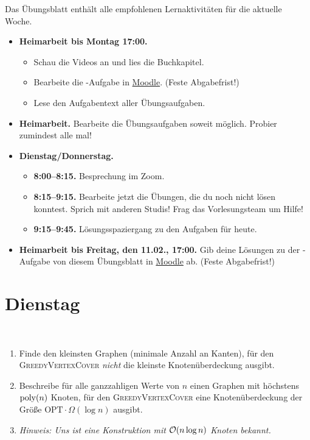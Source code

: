 \documentclass{uebung_cs}
\begin{document}
Das Übungsblatt enthält alle empfohlenen Lernaktivitäten für die aktuelle Woche.

\begin{itemize}
\item \textbf{Heimarbeit bis Montag 17:00.}
    \begin{itemize}
    \item 
    Schau die Videos an und lies die Buchkapitel.
    \item Bearbeite die -Aufgabe in \href{https://moodle.studiumdigitale.uni-frankfurt.de/moodle/course/view.php?id=2241}{Moodle}. (Feste Abgabefrist!)
    \item Lese den Aufgabentext aller Übungsaufgaben.
    \end{itemize}
\item \textbf{Heimarbeit.} Bearbeite die Übungsaufgaben soweit möglich. Probier zumindest alle mal!
\item \textbf{Dienstag/Donnerstag.}
\begin{itemize}
    \item \textbf{8:00--8:15.} Besprechung im Zoom.
    \item \textbf{8:15--9:15.} Bearbeite jetzt die Übungen, die du noch nicht lösen konntest. Sprich mit anderen Studis! Frag das Vorlesungsteam um Hilfe!
    \item \textbf{9:15--9:45.} Lösungsspaziergang zu den Aufgaben für heute.
\end{itemize}

\item \textbf{Heimarbeit bis Freitag, den 11.02., 17:00.} Gib deine Lösungen zu der -Aufgabe von diesem Übungsblatt in \href{https://moodle.studiumdigitale.uni-frankfurt.de/moodle/course/view.php?id=2241}{Moodle} ab. (Feste Abgabefrist!)
\end{itemize}

\section*{Dienstag}

\begin{exercise}\
	\begin{enumerate}
		\item Finde den kleinsten Graphen (minimale Anzahl an Kanten), für den \textsc{GreedyVertexCover} \emph{nicht} die kleinste Knotenüberdeckung ausgibt.
		\item Beschreibe für alle ganzzahligen Werte von $n$ einen Graphen mit höchstens $\operatorname{poly}(n)$ Knoten, für den \textsc{GreedyVertexCover} eine Knotenüberdeckung der Größe $\mathrm{OPT} \cdot \Omega(\log n)$ ausgibt.
		\item[] \textit{Hinweis: Uns ist eine Konstruktion mit $\mathcal{O}(n \log n)$ Knoten bekannt.}
	\end{enumerate}
	
\end{exercise}
\end{document}
